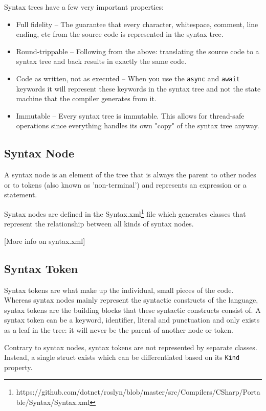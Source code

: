Syntax trees have a few very important properties:

\begin{itemize}
	\item Full fidelity -- The guarantee that every character, whitespace, comment, line ending, etc from the source code is represented in the syntax tree.
	\item Round-trippable -- Following from the above: translating the source code to a syntax tree and back results in exactly the same code.
	\item Code as written, not as executed -- When you use the \verb|async| and \verb|await| keywords it will represent these keywords in the syntax tree and not the state machine that the compiler generates from it.
	\item Immutable -- Every syntax tree is immutable. This allows for thread-safe operations since everything handles its own "copy" of the syntax tree anyway.
\end{itemize}

\subsection{Syntax Node}
\label{sec:syntax-node}

A syntax node is an element of the tree that is always the parent to other nodes or to tokens (also known as 'non-terminal') and represents an expression or a statement. 

Syntax nodes are defined in the Syntax.xml\footnote{https://github.com/dotnet/roslyn/blob/master/src/Compilers/CSharp/Portable/Syntax/Syntax.xml} file which generates classes that represent the relationship between all kinds of syntax nodes. 

[More info on syntax.xml]

\subsection{Syntax Token}
\label{sec:syntax-token}

Syntax tokens are what make up the individual, small pieces of the code. Whereas syntax nodes mainly represent the syntactic constructs of the language, syntax tokens are the building blocks that these syntactic constructs consist of.
A syntax token can be a keyword, identifier, literal and punctuation and only exists as a leaf in the tree: it will never be the parent of another node or token.

Contrary to syntax nodes, syntax tokens are not represented by separate classes. Instead, a single struct exists which can be differentiated based on its \verb|Kind| property. 


